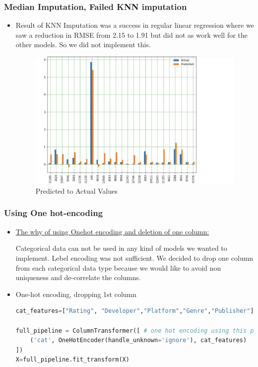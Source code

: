 \begin{frame}[fragile]
    \frametitle{Median Imputation, Failed KNN imputation}
    \begin{itemize}
    \item Result of KNN Imputation was a success in regular linear regression where we saw a reduction in RMSE from 2.15 to 1.91 but did not as work well for the other models. So we did not implement this. 

    \begin{figure}[H]
        \centering
        \includegraphics[scale=0.25]{graphs/improvement.png}
        \caption{Predicted to Actual Values}
        \label{fig:N20}
    \end{figure}
    \end{itemize}
\end{frame}


\begin{frame}[fragile]
    \frametitle{Using One hot-encoding}
    \begin{itemize}
        \item \underline {The why of using Onehot encoding and deletion of one column:} 


        Categorical data can not be used in any kind of models we wanted to implement. Lebel encoding was not sufficient. We decided to drop one column from each categorical data type because we would like to avoid non uniqueness and de-correlate the columns.  
        \item One-hot encoding, dropping 1st column 
    \begin{lstlisting}[language=Python]
    cat_features=["Rating", "Developer","Platform","Genre","Publisher"]

full_pipeline = ColumnTransformer([ # one hot encoding using this python pipeline function. very useful. Analogous to a design matrix
    ('cat', OneHotEncoder(handle_unknown='ignore'), cat_features)
])
X=full_pipeline.fit_transform(X)
    \end{lstlisting}
    \end{itemize}
\end{frame}